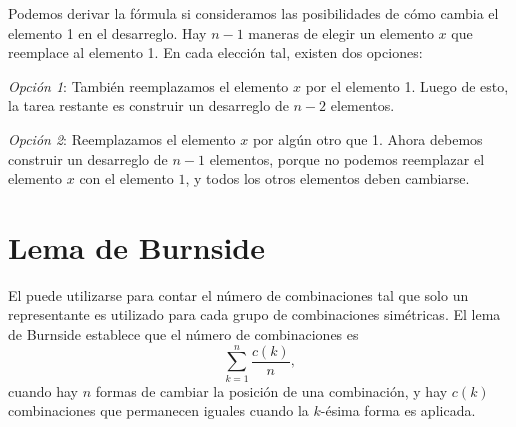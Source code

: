 Podemos derivar la fórmula si consideramos las posibilidades de cómo cambia
el elemento 1 en el desarreglo. Hay $n-1$ maneras de elegir un elemento $x$
que reemplace al elemento 1. En cada elección tal, existen dos opciones:

\textit{Opción 1}: También reemplazamos el elemento $x$ por el elemento 1.
Luego de esto, la tarea restante es construir un desarreglo de $n-2$ elementos.

\textit{Opción 2}: Reemplazamos el elemento $x$ por algún otro que 1.
Ahora debemos construir un desarreglo de $n-1$ elementos, porque no podemos
reemplazar el elemento $x$ con el elemento $1$, y todos los otros elementos
deben cambiarse.

\section{Lema de Burnside}


El  puede utilizarse para contar el número de
combinaciones tal que solo un representante es utilizado para cada grupo
de combinaciones simétricas. El lema de Burnside establece que el número
de combinaciones es
\[\sum_{k=1}^n \frac{c(k)}{n},\]
cuando hay $n$ formas de cambiar la posición de una combinación, y hay
$c(k)$ combinaciones que permanecen iguales cuando la $k$-ésima forma
es aplicada.

